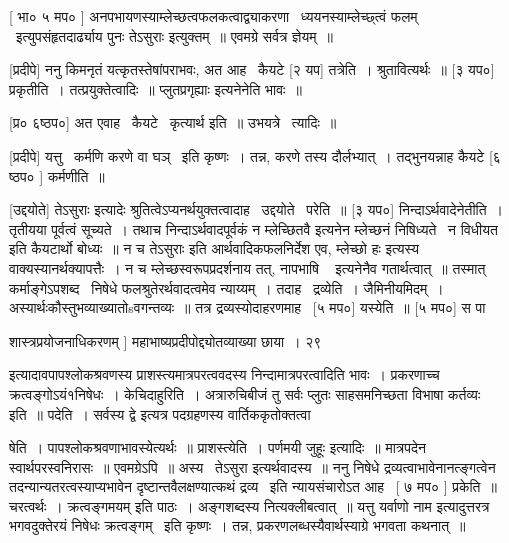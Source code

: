 \documentclass[11pt, openany]{book}
\begin{document}
 [ भा० ५ मप० ] अनपभायणस्याम्लेच्छत्वफलकत्वाद्व्याकरणा \textendash\ 
ध्ययनस्याम्लेच्छ्त्वं फलम् \textendash\ इत्युपसंहृतदार्ढ्याय पुनः {\qt तेऽसुराः
इत्युक्तम्~॥} एवमग्रे सर्वत्र ज्ञेयम्~॥ 

 [प्रदीपे] ननु किमनृतं यत्कृतस्तेषांपराभवः, अत आह \textendash\ कैयटे [२ यप]
तत्रेति~। श्रुतावित्यर्थः~॥ [३ यप०] प्रकृतीति~। 
तत्प्रयुक्तेत्वादिः~॥ {\qt प्लुतप्रगृह्याः} इत्यनेनेति भावः~॥ 

 [प्र० ६ष्ठप०] अत एवाह \textendash\ कैयटे \textendash\ कृत्यार्थ इति~॥ उभयत्रे \textendash\ त्यादिः~॥


 [प्रदीपे] यत्तु \textendash\ कर्मणि करणे वा घञ् \textendash\ इति कृष्णः~। तन्न, करणे तस्य
दौर्लभ्यात्~। तद्भुनयन्नाह कैयटे [६ ष्ठप० ] कर्मणीति~॥ 

 [उद्दयोते] {\qt तेऽसुराः} इत्यादेः श्रुतित्वेऽप्यनर्थयुक्तत्वादाह \textendash\ 
उद्दयोते \textendash\ परेति~॥ [३ यप०] निन्दाऽर्थवादेनेतीति~। तृतीयया पूर्वत्वं
सूच्यते~। तथाच निन्दाऽर्थवादपूर्वकं {\qt न म्लेच्छितवै} इत्यनेन म्लेच्छनं
निषिध्यते \textendash\ न विधीयत इति कैयटार्थो बोध्यः~॥ न च {\qt तेऽसुराः} इति
आर्थवादिकफलनिर्देश एव, {\qt म्लेच्छो हः इत्यस्य वाक्यस्यानर्थक्यापत्तैः~। न
च म्लेच्छस्वरूपप्रदर्शनाय तत्, नापभाषि \textendash\ } इत्यनेनैव गतार्थत्वात्~॥
तस्मात् कर्माङ्गेऽपशब्द \textendash\ निषेधे फलश्रुतेरर्थवादत्वमेव न्याय्यम्~। 
तदाह \textendash\ द्रव्येति~। जैमिनीयमिदम्~। अस्यार्थःकौस्तुभव्याख्यातोsवगन्तव्यः~॥
तत्र द्रव्यस्योदाहरणमाह \textendash\ [५ मप०] यस्येति~॥ [५ मप०] स
पा \textendash\ 

शास्त्रप्रयोजनाधिकरणम् ] महाभाष्यप्रदीपोद्द्योतव्याख्या छाया~। २९



इत्यादावपापश्लोकश्रवणस्य प्राशस्त्यमात्रपरत्ववदस्य
निन्दामात्रपरत्वादिति भावः~। प्रकरणाच्च क्रत्वङ्गोऽयं१निषेधः~। 
केचिदाहुरिति~। अत्रारुचिबीजं तु {\qt सर्वः प्लुतः साहसमनिच्छता विभाषा
कर्तव्यः} इति~॥ पदेति~। {\qt सर्वस्य द्वे} इत्यत्र पदग्रहणस्य
वार्तिककृतोक्तत्वा \textendash\ 



षेति~। पापश्लोकश्रवणाभावस्येत्यर्थः~॥ प्राशस्त्येति~। {\qt पर्णमयी
जुहूः} इत्यादिः~॥ मात्रपदेन स्वार्थपरस्वनिरासः~॥ एवमग्रेऽपि~॥
अस्य \textendash\ तेऽसुरा इत्यर्थवादस्य~॥ ननु निषेधे द्रव्यत्वाभावेनानत्ङ्गत्वेन
तदन्यान्यतरत्वस्याप्यभावेन दृष्टान्तवैलक्षण्यात्कथं {\qt द्रव्य} \textendash\ इति
न्यायसंचारोऽत आह \textendash\ [ ७ मप० ] प्रकेति~॥ चरत्वर्थः~। {\qt क्रत्वङ्गमयम्}
इति पाठः~। अङ्गशब्दस्य नित्यक्लीबत्वात्~॥ यत्तु {\qt यर्वाणो नाम}
इत्यादुत्तरत्र भगवदुक्तेरयं निषेधः क्रत्वङ्गम् \textendash\ इति कृष्णः~। तन्न,
प्रकरणलब्धस्यैवार्थस्याग्रे भगवता कथनात्~॥ 
\end{document}
